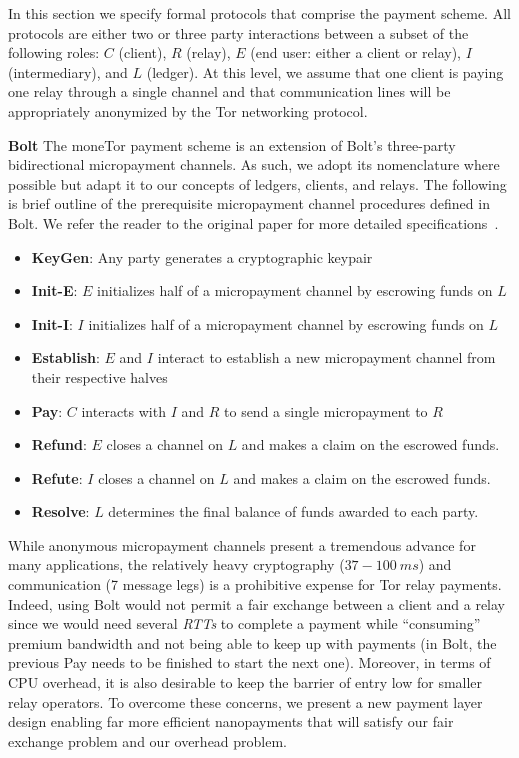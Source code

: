 In this section we specify formal protocols that comprise the payment
scheme. All protocols are either two or three party interactions between a
subset of the following roles: $C$ (client), $R$ (relay), $E$ (end user: either
a client or relay), $I$ (intermediary), and $L$ (ledger). At this level, we
assume that one client is paying one relay through a single channel and that
communication lines will be appropriately anonymized by the Tor networking
protocol.

\textbf{Bolt} The moneTor payment scheme is an extension of Bolt's three-party
bidirectional micropayment channels. As such, we adopt its nomenclature where
possible but adapt it to our concepts of ledgers, clients, and relays. The
following is brief outline of the prerequisite micropayment channel procedures
defined in Bolt. We refer the reader to the original paper for more detailed
specifications~\cite{green2017bolt}.

\begin{itemize}
\item \textbf{KeyGen}: Any party generates a cryptographic keypair
\item \textbf{Init-E}: $E$ initializes half of a micropayment channel by
  escrowing funds on $L$
\item \textbf{Init-I}: $I$ initializes half of a micropayment channel by
  escrowing funds on $L$
\item \textbf{Establish}: $E$ and $I$ interact to establish a new micropayment
  channel from their respective halves
\item \textbf{Pay}: $C$ interacts with $I$ and $R$ to send a single micropayment to $R$
\item \textbf{Refund}: $E$ closes a channel on $L$ and makes a claim on
  the escrowed funds.
\item \textbf{Refute}: $I$ closes a channel on $L$ and makes a claim on
  the escrowed funds.
\item \textbf{Resolve}: $L$ determines the final balance of funds awarded to
  each party.
\end{itemize}

While anonymous micropayment channels present a tremendous advance for many
applications, the relatively heavy cryptography ($37-100\ ms$) and communication
(7 message legs) is a prohibitive expense for Tor relay payments. Indeed, using Bolt would not permit a fair exchange between a client and a relay since we would need several \textit{RTTs} to complete a payment while ``consuming'' premium bandwidth and not being able to keep up with payments (in Bolt, the previous Pay needs to be finished to start the next one). Moreover, in terms of CPU overhead, it is also desirable to keep the
barrier of entry low for smaller relay operators. To overcome these
concerns, we present a new payment layer design enabling far more efficient
nanopayments that will satisfy our fair exchange problem and our overhead problem.

